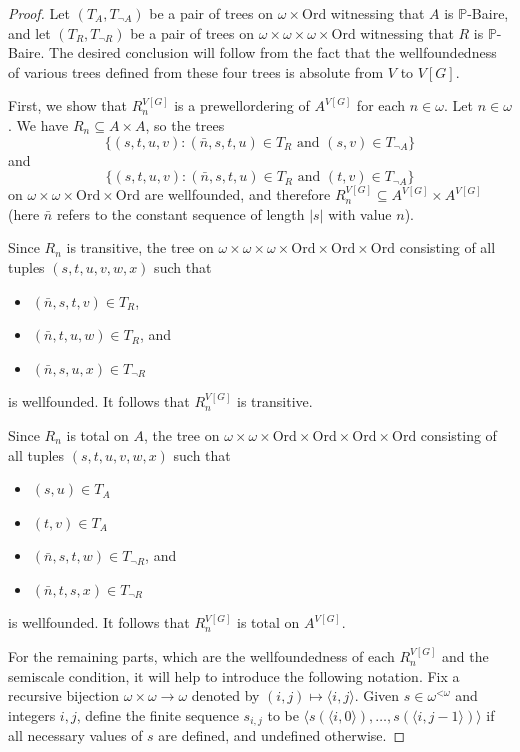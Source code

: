 \documentclass[10pt,a4paper]{amsart}
\newcommand{\Ord}{\mathrm{Ord}}
\newcommand{\less}{\mathord{<}}
\begin{document}
\begin{proof}
 Let $(T_A, T_{\neg A})$ be a pair of trees on $\omega \times \Ord$ witnessing that $A$ is $\mathbb{P}$-Baire, and let
 $(T_R, T_{\neg R})$ be a pair of trees on $\omega \times \omega \times \omega \times \Ord$ witnessing that $R$ is $\mathbb{P}$-Baire.
 The desired conclusion will follow from the fact that the wellfoundedness of various trees defined from these four trees is absolute from $V$ to $V[G]$.

 First, we show that $R^{V[G]}_n$ is a prewellordering of $A^{V[G]}$ for each $n \in \omega$.
 Let $n \in \omega$.
 We have $R_n \subseteq A \times A$,
so the trees
 \[\{ (s, t, u, v)  : (\bar{n}, s, t, u)   \in T_{R} \text{ and }  (s, v) \in T_{\neg A} \}\] and \[\{ (s, t, u, v)  : (\bar{n}, s, t, u)   \in T_{R} \text{ and } (t, v) \in T_{\neg A} \}\]
 on $\omega \times \omega \times \Ord \times \Ord$
 are wellfounded, and therefore 
 $R^{V[G]}_n \subseteq A^{V[G]} \times A^{V[G]}$ (here $\bar{n}$ refers to the constant sequence of length $|s|$ with value $n$).

Since $R_n$ is transitive, the tree on $\omega \times \omega \times \omega \times \Ord \times \Ord \times \Ord$
consisting of all tuples $(s, t, u, v, w, x)$ such that 
\begin{itemize}
 \item $(\bar{n}, s, t, v) \in T_{R}$,
 \item $(\bar{n}, t, u, w) \in T_{R}$, and
 \item $(\bar{n}, s, u, x) \in T_{\neg R}$
\end{itemize}
is wellfounded. It follows that $R^{V[G]}_n$ is transitive.

Since $R_n$ is total on $A$, the tree
on $\omega \times \omega \times \Ord \times \Ord \times \Ord \times \Ord$
consisting of all tuples
$(s, t, u, v, w, x)$
such that 
\begin{itemize}
 \item $(s, u)   \in T_A$
 \item $(t, v)   \in T_A$
 \item $(\bar{n}, s, t, w) \in T_{\neg R}$, and
 \item $(\bar{n}, t, s, x) \in T_{\neg R}$
\end{itemize}
is wellfounded. It follows that $R^{V[G]}_n$ is total on $A^{V[G]}$.


For the remaining parts, which are the wellfoundedness of each $R^{V[G]}_n$ and the 
semiscale condition, it will help to introduce the following notation.
Fix a recursive bijection $\omega \times \omega \to \omega$ denoted by $(i, j) \mapsto \langle i, j \rangle$.
Given
$s \in \omega^{\less\omega}$ and integers $i,j$, define the finite sequence
$s_{i,j}$ to be $\langle s(\langle i, 0\rangle), \ldots, s(\langle i, j-1\rangle)\rangle$
if all necessary values of $s$ are defined, and undefined otherwise.



\end{proof}
\end{document}
